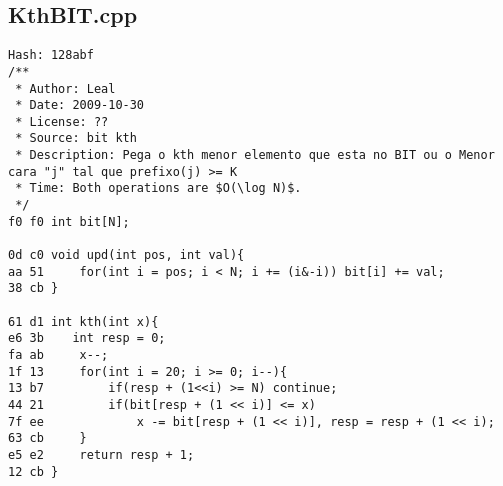 \documentclass[11pt, a4paper, twoside]{article}
\begin{document}
\subsection{KthBIT.cpp}
\begin{lstlisting}
Hash: 128abf
/**
 * Author: Leal
 * Date: 2009-10-30
 * License: ??
 * Source: bit kth
 * Description: Pega o kth menor elemento que esta no BIT ou o Menor cara "j" tal que prefixo(j) >= K
 * Time: Both operations are $O(\log N)$.
 */
f0 f0 int bit[N];
 
0d c0 void upd(int pos, int val){
aa 51     for(int i = pos; i < N; i += (i&-i)) bit[i] += val;
38 cb }
 
61 d1 int kth(int x){
e6 3b    int resp = 0;
fa ab     x--;
1f 13     for(int i = 20; i >= 0; i--){
13 b7         if(resp + (1<<i) >= N) continue;
44 21         if(bit[resp + (1 << i)] <= x) 
7f ee             x -= bit[resp + (1 << i)], resp = resp + (1 << i);
63 cb     }
e5 e2     return resp + 1;
12 cb }
\end{lstlisting}
\end{document}
